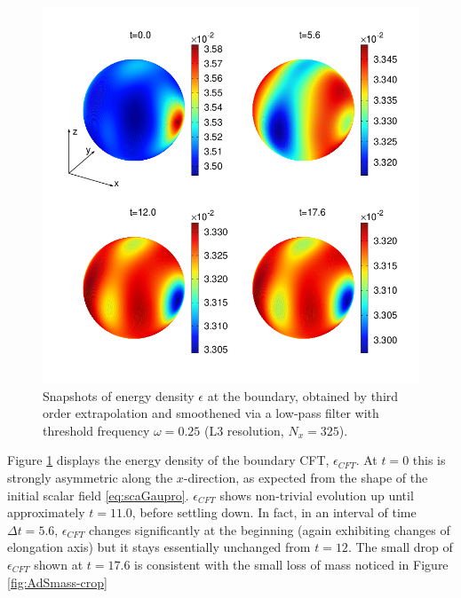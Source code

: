 \documentclass[a4paper,11pt]{article}
\begin{document}
\begin{figure}[!h]
        \centering
        \includegraphics[width=5.0in,clip=true]{plots/bdyplots/L3/bdyenergydensity/sphereplots_bdyenergydensity_L3_2by2.png}
\parbox{5.0in}{\caption{Snapshots of energy density $\epsilon$ at the boundary, obtained by third order extrapolation and smoothened via a low-pass filter with threshold frequency $\omega=0.25$ (L3 resolution, $N_x=325$).
        }\label{fig:snapshotsenergydensity}}
\end{figure}

Figure \ref{fig:snapshotsenergydensity} displays the energy density of the boundary CFT, $\epsilon_{CFT}$. At $t=0$ this is strongly asymmetric along the $x$-direction, as expected from the shape of the initial scalar field \eqref{eq:scaGaupro}. $\epsilon_{CFT}$ shows non-trivial evolution up until approximately $t=11.0$, before settling down. In fact, in an interval of time $\Delta t=5.6$, $\epsilon_{CFT}$ changes significantly at the beginning (again exhibiting changes of elongation axis) but it stays essentially unchanged from $t=12$. The small drop of $\epsilon_{CFT}$ shown at $t=17.6$ is consistent with the small loss of mass noticed in Figure \ref{fig:AdSmass-crop}

\end{document}
